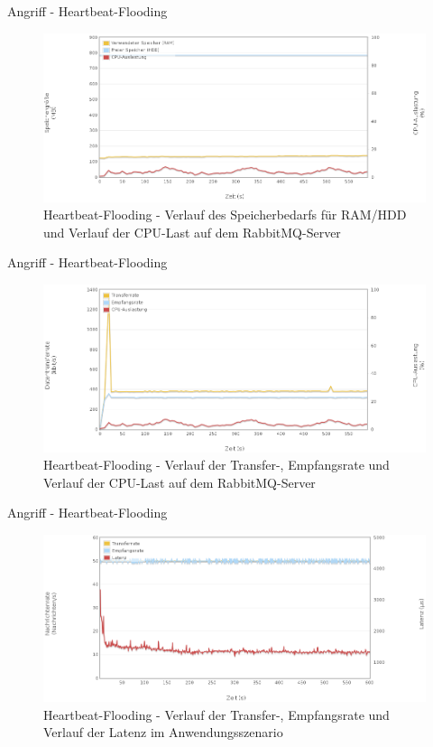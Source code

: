 \documentclass[10pt]{beamer}
\begin{document}
\begin{frame}{Angriff - Heartbeat-Flooding}
\begin{figure}[!htb]
	\centering
	\includegraphics[width=\textwidth]{img/heartbeat/heartbeat_server1.png}
	\caption{\centering Heartbeat-Flooding - Verlauf des Speicherbedarfs für RAM/HDD und Verlauf der CPU-Last auf dem RabbitMQ-Server}
	\label{fig:heartbeat-server1}
\end{figure}
\end{frame}
	
\begin{frame}{Angriff - Heartbeat-Flooding}	
\begin{figure}[!htb]
	\centering
	\includegraphics[width=\textwidth]{img/heartbeat/heartbeat_server2.png}
	\caption{\centering Heartbeat-Flooding - Verlauf der Transfer-, Empfangsrate und Verlauf der CPU-Last auf dem RabbitMQ-Server}
	\label{fig:heartbeat-server2}
\end{figure}
\end{frame}
	
\begin{frame}{Angriff - Heartbeat-Flooding}
\begin{figure}[!htb]
	\centering
	\includegraphics[width=\textwidth]{img/heartbeat/heartbeat_scenario.png}
	\caption{\centering Heartbeat-Flooding - Verlauf der Transfer-, Empfangsrate und Verlauf der Latenz im Anwendungsszenario}
	\label{fig:heartbeat-scenario}
\end{figure}
\end{frame}
\end{document}
